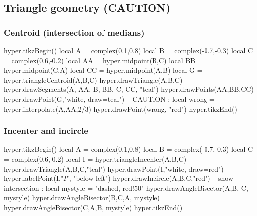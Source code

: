 \documentclass{article}
\begin{document}
\subsection{Triangle geometry (CAUTION)}

\subsubsection{Centroid (intersection of medians)}
\begin{codeandresult}
\begin{luacode*}
hyper.tikzBegin()
local A = complex(0.1,0.8)
local B = complex(-0.7,-0.3)
local C = complex(0.6,-0.2)
local AA = hyper.midpoint(B,C)
local BB = hyper.midpoint(C,A)
local CC = hyper.midpoint(A,B)
local G = hyper.triangleCentroid(A,B,C) 
hyper.drawTriangle(A,B,C)
hyper.drawSegments(A, AA, B, BB, C, CC, "teal")
hyper.drawPoints(AA,BB,CC)
hyper.drawPoint(G,"white, draw=teal")
-- CAUTION : 
local wrong = hyper.interpolate(A,AA,2/3)
hyper.drawPoint(wrong, "red")
hyper.tikzEnd()
\end{luacode*}
\end{codeandresult}


\subsubsection{Incenter and incircle}
\begin{codeandresult}
\begin{luacode*}
hyper.tikzBegin()
local A = complex(0.1,0.8)
local B = complex(-0.7,-0.3)
local C = complex(0.6,-0.2)
local I = hyper.triangleIncenter(A,B,C)
hyper.drawTriangle(A,B,C,"teal")
hyper.drawPoint(I,"white, draw=red")
hyper.labelPoint(I,"$I$", "below left")
hyper.drawIncircle(A,B,C,"red")
-- show intersection : 
local mystyle = "dashed, red!50"
hyper.drawAngleBisector(A,B, C, mystyle)
hyper.drawAngleBisector(B,C,A, mystyle)
hyper.drawAngleBisector(C,A,B, mystyle)
hyper.tikzEnd()
\end{luacode*}
\end{codeandresult}
\end{document}
